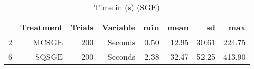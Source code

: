 \begin{table}[ht]
\centering
\begin{tabular}{rrrrrrrr}
  \hline
 & Treatment & Trials & Variable & min & mean & sd & max \\ 
  \hline
2 & MCSGE & 200 & Seconds & 0.50 & 12.95 & 30.61 & 224.75 \\ 
  6 & SQSGE & 200 & Seconds & 2.38 & 32.47 & 52.25 & 413.90 \\ 
   \hline
\end{tabular}
\caption{Time in (s) (SGE)} 
\end{table}
